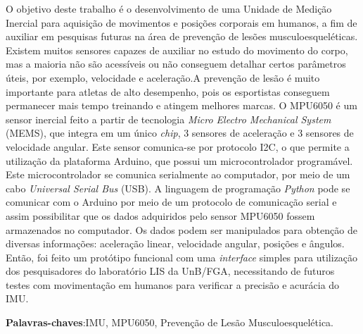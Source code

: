 \begin{resumo}
 
 \noindent
 O objetivo deste trabalho é o desenvolvimento de uma Unidade de Medição Inercial para aquisição de movimentos e posições corporais em humanos, a fim de auxiliar em pesquisas futuras na área de prevenção de lesões musculoesqueléticas. Existem muitos sensores capazes de auxiliar no estudo do movimento do corpo, mas a maioria não são acessíveis ou não conseguem detalhar certos parâmetros úteis, por exemplo, velocidade e aceleração.A prevenção de lesão é muito importante para atletas de alto desempenho, pois os esportistas conseguem permanecer mais tempo treinando e atingem melhores marcas. O MPU6050 é um sensor inercial feito a partir de tecnologia \textit{Micro Electro Mechanical System} (MEMS), que integra em um único \textit{chip}, 3 sensores de aceleração e 3 sensores de velocidade angular. Este sensor comunica-se por protocolo I2C, o que permite a utilização da plataforma Arduino, que possui um microcontrolador programável. Este microcontrolador se comunica serialmente ao computador, por meio de um cabo \textit{Universal  Serial Bus} (USB). A linguagem de programação \textit{Python} pode se comunicar com o Arduino por meio de um protocolo de comunicação serial e assim possibilitar que os dados adquiridos pelo sensor MPU6050 fossem armazenados no computador. Os dados podem ser manipulados para obtenção de diversas informações: aceleração linear, velocidade angular, posições e ângulos. Então, foi feito um protótipo funcional com uma \textit{interface} simples para utilização dos pesquisadores do laboratório LIS da UnB/FGA, necessitando de futuros testes com movimentação em humanos para verificar a precisão e acurácia do IMU. 
 
 \vspace{\onelineskip}
 \textbf{Palavras-chaves}:IMU, MPU6050, Prevenção de Lesão Musculoesquelética.
\end{resumo}
